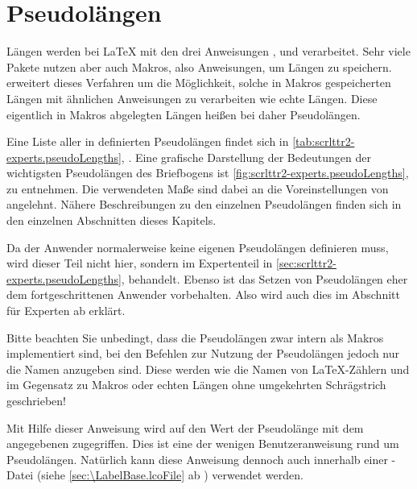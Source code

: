 \section{Pseudolängen}
\BeginIndexGroup
{}

Längen werden bei \LaTeX{} mit den drei Anweisungen
, 
und  verarbeitet. Sehr viele Pakete
nutzen aber auch Makros, also Anweisungen, um Längen zu
speichern. \KOMAScript{} erweitert dieses Verfahren um die Möglichkeit, solche
in Makros gespeicherten Längen mit ähnlichen Anweisungen zu verarbeiten wie
echte Längen. Diese eigentlich in Makros abgelegten Längen heißen bei
\KOMAScript{} daher Pseudolängen.

Eine Liste aller in  definierten Pseudolängen findet sich in
\autoref{tab:scrlttr2-experts.pseudoLengths},
. Eine grafische Darstellung
der Bedeutungen der wichtigsten Pseudolängen des Briefbogens ist
\autoref{fig:scrlttr2-experts.pseudoLengths},
 zu entnehmen. Die verwendeten
Maße sind dabei an die Voreinstellungen von  angelehnt. Nähere
Beschreibungen zu den einzelnen Pseudolängen finden sich in den einzelnen
Abschnitten dieses Kapitels.

Da der Anwender normalerweise keine eigenen Pseudolängen definieren muss, wird
dieser Teil nicht hier, sondern im Expertenteil in
\autoref{sec:scrlttr2-experts.pseudoLengths},
 behandelt. Ebenso ist das
Setzen von Pseudolängen eher dem fortgeschrittenen Anwender vorbehalten. Also
wird auch dies im Abschnitt für Experten ab
 erklärt.

Bitte beachten Sie unbedingt, dass die Pseudolängen zwar
intern als Makros implementiert sind, bei den Befehlen zur Nutzung der
Pseudolängen jedoch nur die Namen anzugeben sind. Diese werden wie die Namen
von \LaTeX-Zählern und im Gegensatz zu Makros oder echten Längen ohne
umgekehrten Schrägstrich geschrieben!

\begin{Declaration}
\end{Declaration}
Mit Hilfe dieser Anweisung wird auf den Wert der Pseudolänge mit dem
angegebenen  zugegriffen. Dies ist eine der wenigen
Benutzeranweisung rund um Pseudolängen. Natürlich kann diese Anweisung dennoch
auch innerhalb einer -Datei (siehe
\autoref{sec:\LabelBase.lcoFile} ab )
verwendet werden.%
%
\EndIndexGroup


